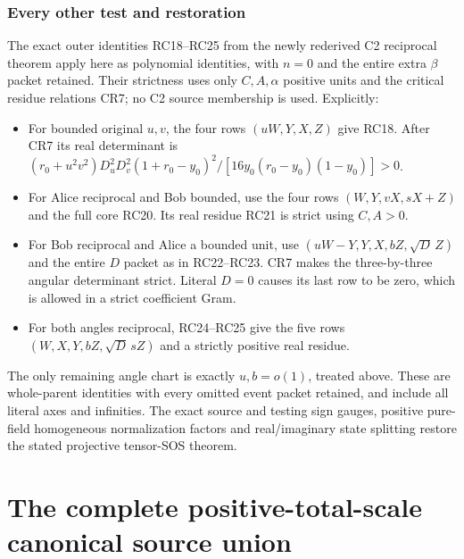 \subsubsection*{Every other test and restoration}

The exact outer identities RC18--RC25 from the newly rederived
C2 reciprocal theorem apply here as polynomial identities, with
$n=0$ and the entire extra $\beta$ packet retained. Their strictness
uses only $C,A,\alpha$ positive units and the critical residue
relations CR7; no C2 source membership is used. Explicitly:
\begin{itemize}
\item For bounded original $u,v$, the four rows $(uW,Y,X,Z)$
give RC18. After CR7 its real determinant is
$ (r_0+u^2v^2)D_u^2D_v^2(1+r_0-y_0)^2/
[16y_0(r_0-y_0)(1-y_0)]>0$.
\item For Alice reciprocal and Bob bounded, use the four rows
$(W,Y,vX,sX+Z)$ and the full core RC20. Its real residue RC21
is strict using $C,A>0$.
\item For Bob reciprocal and Alice a bounded unit, use
$(uW-Y,Y,X,bZ,\sqrt D\,Z)$ and the entire $D$ packet as in
RC22--RC23. CR7 makes the three-by-three angular determinant
strict. Literal $D=0$ causes its last row to be zero, which is
allowed in a strict coefficient Gram.
\item For both angles reciprocal, RC24--RC25 give the five rows
$(W,X,Y,bZ,\sqrt D\,sZ)$ and a strictly positive real residue.
\end{itemize}
The only remaining angle chart is exactly $u,b=o(1)$, treated
above. These are whole-parent identities with every omitted event
packet retained, and include all literal axes and infinities.
The exact source and testing sign gauges, positive pure-field
homogeneous normalization factors and real/imaginary state splitting
restore the stated projective tensor-SOS theorem.



\section{\texorpdfstring{The complete positive-total-scale canonical source union}{The complete positive-total-scale canonical source union}}
\label{component:pc0b2849f8d09}

\label{pc0b2849f8d09:sec:positive-scale-union-rederived}

